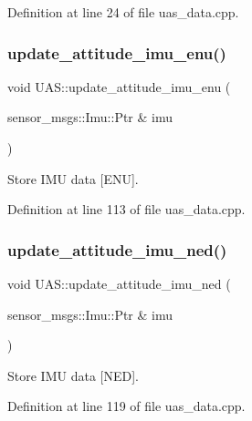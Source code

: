 Definition at line 24 of file uas\+\_\+data.\+cpp.

\mbox{\label{group__nodelib_gaca39c9b4dfce83909e2bde0796564341}} 
\subsubsection{\texorpdfstring{update\_attitude\_imu\_enu()}{update\_attitude\_imu\_enu()}}
{\footnotesize\ttfamily void U\+A\+S\+::update\+\_\+attitude\+\_\+imu\+\_\+enu (\begin{DoxyParamCaption}\item[{sensor\+\_\+msgs\+::\+Imu\+::\+Ptr \&}]{imu }\end{DoxyParamCaption})}



Store I\+MU data \mbox{[}E\+NU\mbox{]}. 



Definition at line 113 of file uas\+\_\+data.\+cpp.

\mbox{\label{group__nodelib_gacd6fc1ac631a90619d7f53fa5ab9b29d}} 
\subsubsection{\texorpdfstring{update\_attitude\_imu\_ned()}{update\_attitude\_imu\_ned()}}
{\footnotesize\ttfamily void U\+A\+S\+::update\+\_\+attitude\+\_\+imu\+\_\+ned (\begin{DoxyParamCaption}\item[{sensor\+\_\+msgs\+::\+Imu\+::\+Ptr \&}]{imu }\end{DoxyParamCaption})}



Store I\+MU data \mbox{[}N\+ED\mbox{]}. 



Definition at line 119 of file uas\+\_\+data.\+cpp.

\mbox{\label{group__nodelib_ga6e1867e65586363b66cc274a970c0660}} 
